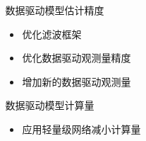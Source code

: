 \begin{frame}
\begin{columns}[t]
\begin{column}{0.5\textwidth}
{\begin{tabular*}{\linewidth}{@{\extracolsep{\fill}}cccc}
				\bottomrule
			\end{tabular*}          
		}
		\end{column}   
		\begin{column}{0.5\textwidth}
			\begin{block}{数据驱动模型估计精度}
			   {
			       \footnotesize
					\begin{itemize}
					    \item 优化滤波框架
						\item 优化数据驱动观测量精度
						\item 增加新的数据驱动观测量
					\end{itemize}
				}
			\end{block}
			\begin{block}{数据驱动模型计算量}
			    {
			        \footnotesize
					\begin{itemize}
						\item 应用轻量级网络减小计算量
					\end{itemize}
				}
			\end{block}
		\end{column}
	\end{columns}	
\end{frame}

